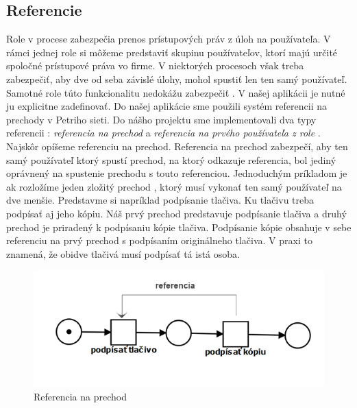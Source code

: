 \subsection{Referencie}
Role v procese zabezpečia prenos prístupových práv z úloh na používateľa. V rámci jednej role si môžeme predstaviť skupinu používateľov, ktorí majú určité spoločné prístupové práva vo firme. V niektorých procesoch však treba zabezpečiť, aby dve od seba závislé úlohy, mohol spustiť len ten samý používateľ. Samotné role túto funkcionalitu nedokážu zabezpečiť . V našej aplikácii je nutné ju explicitne zadefinovať. Do našej aplikácie sme použili systém referencii na prechody v Petriho sieti. Do nášho projektu sme implementovali dva typy referencii : \emph{referencia na prechod} a \emph{referencia na prvého používateľa z role} .\\ 

Najskôr opíšeme referenciu na prechod. Referencia na prechod zabezpečí, aby ten samý používateľ ktorý spustí prechod, na ktorý odkazuje referencia, bol jediný oprávnený na spustenie prechodu s touto referenciou. Jednoduchým príkladom je ak rozložíme jeden zložitý prechod , ktorý musí vykonať ten samý používateľ na dve menšie. Predstavme si napríklad podpísanie tlačiva. Ku tlačivu treba podpísať aj jeho kópiu. Náš prvý prechod predstavuje podpísanie tlačiva a druhý prechod je priradený k podpísaniu kópie tlačiva. Podpísanie kópie obsahuje v sebe referenciu na prvý prechod s podpísaním originálneho tlačiva. V praxi to znamená, že obidve tlačivá musí podpísať tá istá osoba. \\

	\begin{figure}[h]
		\centering
		\includegraphics[width=0.7\linewidth]{images/referencia}
		\caption{Referencia na prechod}
		\label{fig:referencia_na_prechod}
	\end{figure}


